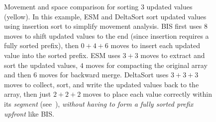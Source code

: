 \begin{figure}[t]
\caption{Movement and space comparison for sorting $3$ updated values (yellow). In this example, ESM and DeltaSort sort updated values using insertion sort to simplify movement analysis. BIS first uses $8$ moves to shift updated values to the end (since insertion requires a fully sorted prefix), then $0+4+6$ moves to insert each updated value into the sorted prefix. ESM uses $3+3$ moves to extract and sort the updated values, $4$ moves for compacting the original array and then $6$ moves for backward merge. DeltaSort uses $3+3+3$ moves to collect, sort, and write the updated values back to the array, then just $2+2+2$ moves to place each value correctly within its \emph{segment} (see~), \emph{without having to form a fully sorted prefix upfront} like BIS.}
\label{fig:algorithm-comparison}
\end{figure}
